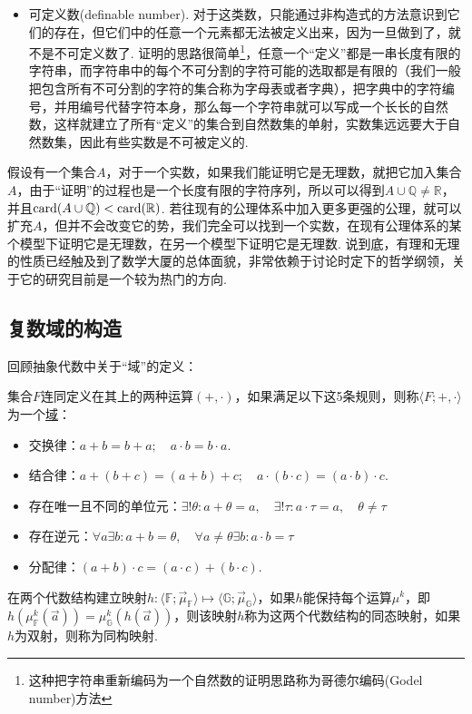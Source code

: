 \documentclass[main.tex]{subfiles}
\begin{document}
\begin{itemize}
    \item[(3)]
    可定义数(definable number). 对于这类数，只能通过非构造式的方法意识到它们的存在，但它们中的任意一个元素都无法被定义出来，因为一旦做到了，就不是不可定义数了. 证明的思路很简单\footnote{这种把字符串重新编码为一个自然数的证明思路称为哥德尔编码(Godel number)方法}，任意一个“定义”都是一串长度有限的字符串，而字符串中的每个不可分割的字符可能的选取都是有限的（我们一般把包含所有不可分割的字符的集合称为字母表或者字典），把字典中的字符编号，并用编号代替字符本身，那么每一个字符串就可以写成一个长长的自然数，这样就建立了所有“定义”的集合到自然数集的单射，实数集远远要大于自然数集，因此有些实数是不可被定义的.
\end{itemize}

假设有一个集合\(A\)，对于一个实数，如果我们能证明它是无理数，就把它加入集合\(A\)，由于“证明”的过程也是一个长度有限的字符序列，所以可以得到\(A\cup\mathbb{Q}\neq \mathbb{R}\)，并且\({\rm card}(A\cup\mathbb{Q})<{\rm card}(\mathbb{R})\). 若往现有的公理体系中加入更多更强的公理，就可以扩充\(A\)，但并不会改变它的势，我们完全可以找到一个实数，在现有公理体系的某个模型下证明它是无理数，在另一个模型下证明它是无理数. 说到底，有理和无理的性质已经触及到了数学大厦的总体面貌，非常依赖于讨论时定下的哲学纲领，关于它的研究目前是一个较为热门的方向.

\subsection{复数域的构造}

回顾抽象代数中关于“域”的定义：
\begin{reference}
    集合\(F\)连同定义在其上的两种运算\((+,\cdot)\)，如果满足以下这5条规则，则称\(\langle F; +, \cdot \rangle\)为一个\uline{域}：
    \begin{itemize}
        \item [(1)] 交换律：\(a+b=b+a; \quad a \cdot b = b \cdot a\).
        \item [(2)] 结合律：\(a+(b+c) = (a+b)+c; \quad a \cdot (b \cdot c) = (a \cdot b) \cdot c\).
        \item [(3)] 存在唯一且不同的单位元：\(\exists!\theta: a+\theta=a, \quad \exists!\tau: a\cdot \tau = a, \quad \theta\neq\tau\)
        \item [(4)] 存在逆元：\(\forall a\exists b: a+b=\theta, \quad \forall a\neq \theta \exists b: a\cdot b = \tau\)
        \item [(5)] 分配律：\((a+b)\cdot c = (a \cdot c)+(b \cdot c)\).
    \end{itemize}
    在两个代数结构建立映射\(h: \langle \mathbb{F}; \vec{\mu}_\mathbb{F} \rangle \mapsto \langle \mathbb{G}; \vec{\mu}_\mathbb{G} \rangle\)，如果\(h\)能保持每个运算\(\mu^k\)，即\(h(\mu_\mathbb{F}^k(\vec{a})) = \mu_{\mathbb{G}}^k(h(\vec{a}))\)，则该映射\(h\)称为这两个代数结构的同态映射，如果\(h\)为双射，则称为同构映射.
\end{reference}
\end{document}

